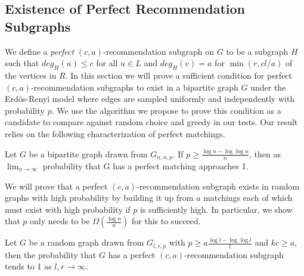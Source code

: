 \subsection{Existence of Perfect Recommendation Subgraphs}
We define a \emph{perfect} $(c,a)$-recommendation subgraph on $G$ to be a subgraph $H$ such that
$deg_H(u)\leq c$ for all $u\in L$ and $deg_H(v)=a$ for
$\min(r,cl/a)$ of the vertices in $R$. In this section we will
prove a sufficient condition for perfect $(c,a)$-recommendation
subgraphs to exist in a bipartite graph $G$ under the Erd\"os-Renyi model\cite{ErdosRenyi59} where edges are sampled
uniformly and independently with probability $p$.
We use the algorithm we propose to prove this condition as a candidate to compare against random choice and greedy in our tests.
Our result relies on
the following characterization of perfect matchings.

\begin{thm}\cite{Janson2011}
\label{random_matching_threshold}
Let $G$ be a bipartite graph drawn from $G_{n, n, p}$. If $p \geq \frac{\log n -
\log\log n}{n}$, then as $\lim_{n\to\infty}$ probability that G has a perfect
    matching approaches 1.
\end{thm}

We will prove that a perfect $(c,a)$-recommendation subgraph exists in
random graphs with high probability by building it up from $a$
matchings each of which must exist with high probability if $p$ is
sufficiently high. In particular, we show that $p$ only needs to
be $\Omega(\frac{\log n}{n})$ for this to succeed.

\begin{thm}
Let $G$ be a random graph drawn from $G_{l, r, p}$ with $p\geq a\frac{\log l-\log\log
l}{l}$ and $kc \geq a$, then the probability that $G$ has a perfect $(c, a)$-recommendation
subgraph tends to 1 as $l,r\to\infty$.
\end{thm}

